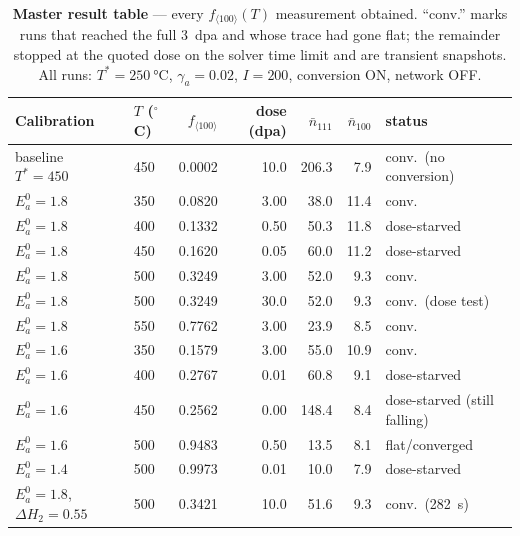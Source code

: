 \documentclass[11pt,a4paper]{article}
\newcommand{\fhkl}{f_{\langle100\rangle}}
\begin{document}
\begin{table}[h]
\centering
\caption{\textbf{Master result table} --- every $\fhkl(T)$ measurement obtained.
``conv.'' marks runs that reached the full 3~dpa and whose trace had gone flat;
the remainder stopped at the quoted dose on the solver time limit and are
transient snapshots. All runs: $T^\ast=\SI{250}{\celsius}$,
$\gamma_a=0.02$, $I=200$, conversion ON, network OFF.}
\label{tab:master}
\begin{tabular}{llrrrrl}
\toprule
Calibration & $T$ ($^\circ$C) & $\fhkl$ & dose (dpa) & $\bar n_{111}$ &
$\bar n_{100}$ & status \\
\midrule
baseline $T^\ast=450$ & 450 & 0.0002 & 10.0  & 206.3 & 7.9  & conv.\ (no conversion) \\
\midrule
$E_a^0=1.8$ & 350 & 0.0820 & 3.00 & 38.0  & 11.4 & conv. \\
$E_a^0=1.8$ & 400 & 0.1332 & 0.50 & 50.3  & 11.8 & dose-starved \\
$E_a^0=1.8$ & 450 & 0.1620 & 0.05 & 60.0  & 11.2 & dose-starved \\
$E_a^0=1.8$ & 500 & 0.3249 & 3.00 & 52.0  & 9.3  & conv. \\
$E_a^0=1.8$ & 500 & 0.3249 & 30.0 & 52.0  & 9.3  & conv.\ (dose test) \\
$E_a^0=1.8$ & 550 & 0.7762 & 3.00 & 23.9  & 8.5  & conv. \\
\midrule
$E_a^0=1.6$ & 350 & 0.1579 & 3.00 & 55.0  & 10.9 & conv. \\
$E_a^0=1.6$ & 400 & 0.2767 & 0.01 & 60.8  & 9.1  & dose-starved \\
$E_a^0=1.6$ & 450 & 0.2562 & 0.00 & 148.4 & 8.4  & dose-starved (still falling) \\
$E_a^0=1.6$ & 500 & 0.9483 & 0.50 & 13.5  & 8.1  & flat/converged \\
$E_a^0=1.4$ & 500 & 0.9973 & 0.01 & 10.0  & 7.9  & dose-starved \\
\midrule
$E_a^0=1.8$, $\Delta H_2\!=\!0.55$ & 500 & 0.3421 & 10.0 & 51.6 & 9.3 & conv.\ (282~s) \\
\bottomrule
\end{tabular}
\end{table}
\end{document}
